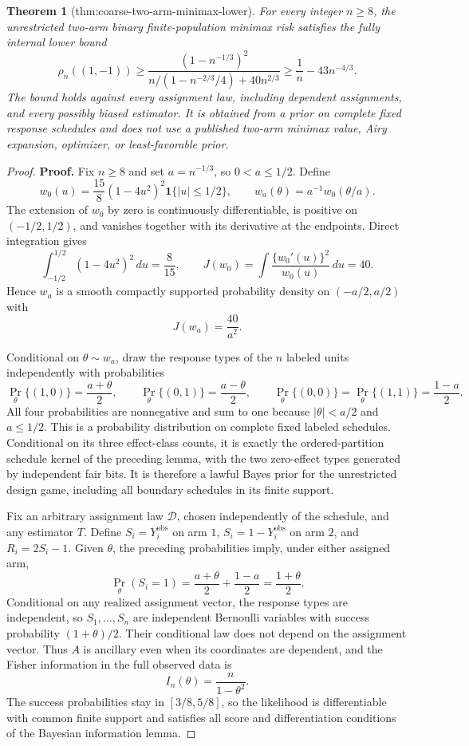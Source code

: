 \documentclass{article}
\newtheorem{theorem}{Theorem}
\begin{document}
\begin{theorem}[thm:coarse-two-arm-minimax-lower]\label{thm:coarse-two-arm-minimax-lower}
For every integer \(n\geq8\), the unrestricted two-arm binary finite-population minimax risk satisfies the fully internal lower bound
\[
 \rho_n((1,-1))
 \geq
 \frac{(1-n^{-1/3})^2}
 {n/(1-n^{-2/3}/4)+40n^{2/3}}
 \geq \frac1n-43n^{-4/3}.
\]
The bound holds against every assignment law, including dependent assignments, and every possibly biased estimator. It is obtained from a prior on complete fixed response schedules and does not use a published two-arm minimax value, Airy expansion, optimizer, or least-favorable prior.
\end{theorem}
\begin{proof}
\textbf{Proof.}
Fix \(n\geq8\) and set \(a=n^{-1/3}\), so \(0<a\leq1/2\). Define
\[
 w_0(u)=\frac{15}{8}(1-4u^2)^2\mathbf 1\{|u|\leq1/2\},
 \qquad
 w_a(\theta)=a^{-1}w_0(\theta/a).
\]
The extension of \(w_0\) by zero is continuously differentiable, is positive on \((-1/2,1/2)\), and vanishes together with its derivative at the endpoints. Direct integration gives
\[
 \int_{-1/2}^{1/2}(1-4u^2)^2\,du=\frac8{15},
 \qquad
 J(w_0)=\int\frac{\{w_0'(u)\}^2}{w_0(u)}\,du=40.
\]
Hence \(w_a\) is a smooth compactly supported probability density on \((-a/2,a/2)\) with
\[
 J(w_a)=\frac{40}{a^2}.
\]

Conditional on \(\theta\sim w_a\), draw the response types of the \(n\) labeled units independently with probabilities
\[
 \Pr_\theta\{(1,0)\}=\frac{a+\theta}{2},\qquad
 \Pr_\theta\{(0,1)\}=\frac{a-\theta}{2},\qquad
 \Pr_\theta\{(0,0)\}=\Pr_\theta\{(1,1)\}=\frac{1-a}{2}.
\]
All four probabilities are nonnegative and sum to one because \(|\theta|<a/2\) and \(a\leq1/2\). This is a probability distribution on complete fixed labeled schedules. Conditional on its three effect-class counts, it is exactly the ordered-partition schedule kernel of the preceding lemma, with the two zero-effect types generated by independent fair bits. It is therefore a lawful Bayes prior for the unrestricted design game, including all boundary schedules in its finite support.

Fix an arbitrary assignment law \(\mathcal D\), chosen independently of the schedule, and any estimator \(T\). Define \(S_i=Y_i^{\mathrm{obs}}\) on arm \(1\), \(S_i=1-Y_i^{\mathrm{obs}}\) on arm \(2\), and \(R_i=2S_i-1\). Given \(\theta\), the preceding probabilities imply, under either assigned arm,
\[
 \Pr_\theta(S_i=1)=\frac{a+\theta}{2}+\frac{1-a}{2}
 =\frac{1+\theta}{2}.
\]
Conditional on any realized assignment vector, the response types are independent, so \(S_1,\ldots,S_n\) are independent Bernoulli variables with success probability \((1+\theta)/2\). Their conditional law does not depend on the assignment vector. Thus \(A\) is ancillary even when its coordinates are dependent, and the Fisher information in the full observed data is
\[
 I_n(\theta)=\frac{n}{1-\theta^2}.
\]
The success probabilities stay in \([3/8,5/8]\), so the likelihood is differentiable with common finite support and satisfies all score and differentiation conditions of the Bayesian information lemma.


\end{proof}
\end{document}
